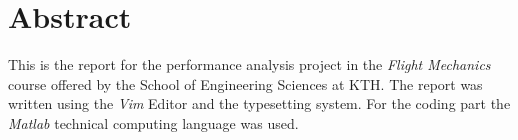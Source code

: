 \section{Abstract}
This is the report for the performance analysis project in the \textit{Flight Mechanics} course
offered by the School of Engineering Sciences at KTH. The report was written using the \textit{Vim} Editor
and the \XeLaTeX typesetting system. For the coding part the \textit{Matlab} technical computing language was used.

